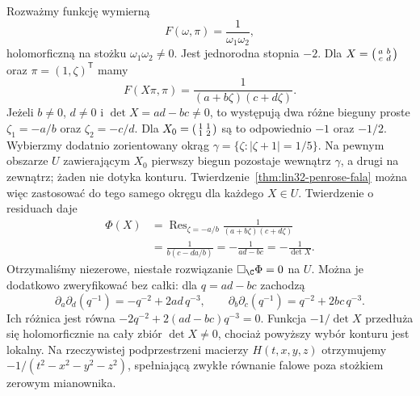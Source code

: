 \begin{przyklad}
\label{prz:lin32-penrose-residuum}
Rozważmy funkcję wymierną
\[
 F(\omega,\pi)=\frac{1}{\omega_1\omega_2},
\]
holomorficzną na stożku $\omega_1\omega_2\ne0$.
Jest jednorodna stopnia $-2$.
Dla $X=\begin{psmallmatrix}a&b\\c&d\end{psmallmatrix}$
oraz $\pi=(1,\zeta)^{\mathsf T}$ mamy
\[
 F(X\pi,\pi)
 =\frac{1}{(a+b\zeta)(c+d\zeta)}.
\]
Jeżeli $b\ne0$, $d\ne0$ i $\det X=ad-bc\ne0$,
to występują dwa różne bieguny proste
$\zeta_1=-a/b$ oraz $\zeta_2=-c/d$.
Dla $X_0=\begin{psmallmatrix}1&1\\1&2\end{psmallmatrix}$
są to odpowiednio $-1$ oraz $-1/2$.
Wybierzmy dodatnio zorientowany okrąg
$\gamma=\{\zeta:|\zeta+1|=1/5\}$.
Na pewnym obszarze $U$ zawierającym $X_0$
pierwszy biegun pozostaje wewnątrz $\gamma$,
a drugi na zewnątrz; żaden nie dotyka konturu.
Twierdzenie~\ref{thm:lin32-penrose-fala}
można więc zastosować do tego samego okręgu
dla każdego $X\in U$.
Twierdzenie o residuach daje
\[
 \begin{aligned}
 \Phi(X)
 &=\operatorname{Res}_{\zeta=-a/b}
   \frac{1}{(a+b\zeta)(c+d\zeta)}\\
 &=\frac{1}{b(c-da/b)}
   =-\frac1{ad-bc}=-\frac1{\det X}.
 \end{aligned}
\]
Otrzymaliśmy niezerowe, niestałe rozwiązanie
$\Box_{\C}\Phi=0$ na $U$.
Można je dodatkowo zweryfikować bez całki:
dla $q=ad-bc$ zachodzą
\[
 \partial_a\partial_d(q^{-1})
   =-q^{-2}+2ad\,q^{-3},\qquad
 \partial_b\partial_c(q^{-1})
   =q^{-2}+2bc\,q^{-3}.
\]
Ich różnica jest równa
$-2q^{-2}+2(ad-bc)q^{-3}=0$.
Funkcja $-1/\det X$ przedłuża się
holomorficznie na cały zbiór $\det X\ne0$,
chociaż powyższy wybór konturu jest lokalny.
Na rzeczywistej podprzestrzeni macierzy
$H(t,x,y,z)$ otrzymujemy
$-1/(t^2-x^2-y^2-z^2)$,
spełniającą zwykłe równanie falowe
poza stożkiem zerowym mianownika.
\end{przyklad}

